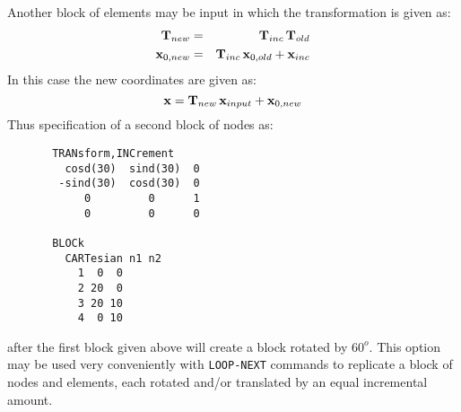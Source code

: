 
Another block of elements may be input in which the transformation
is given as:
\begin{eqnarray*}
  \mathbf{T}_{new} &=& \mathbf{T}_{inc} \, \mathbf{T}_{old} \\
  \mathbf{x}_{0,new} &=& \mathbf{T}_{inc} \, \mathbf{x}_{0,old} + \mathbf{x}_{inc}
\end{eqnarray*}
In this case the new coordinates are given as:
\begin{displaymath}
\mathbf{x} = \mathbf{T}_{new} \, \mathbf{x}_{input} + \mathbf{x}_{0,new}
\end{displaymath}
Thus specification of a second block of nodes as:
\begin{verbatim}
       TRANsform,INCrement
         cosd(30)  sind(30)  0
        -sind(30)  cosd(30)  0
            0         0      1
            0         0      0

       BLOCk
         CARTesian n1 n2
           1  0  0
           2 20  0
           3 20 10
           4  0 10
\end{verbatim}
after the first block given above will create a block rotated by $60^o$.
This option may be used very conveniently with \texttt{LOOP-NEXT} commands to
replicate a block of nodes and elements, each rotated and/or translated by
an equal incremental amount.
\vfil\eject
